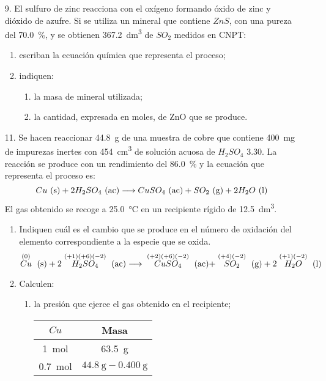 \documentclass[../practica.root.tex]{subfiles}
\begin{document}
\begin{enumerate}
	\item[9.] El sulfuro de zinc reacciona con el oxígeno formando óxido de zinc y dióxido de azufre.
	      Si se utiliza un mineral que contiene $ZnS$, con una pureza del \SI{70,0}{\percent}, y se obtienen
	      \SI{367,2}{\dm\cubed} de $SO_2$ medidos en CNPT:
	      \begin{enumerate}
		      \item escriban la ecuación química que representa el proceso;
		      \item indiquen:
		            \begin{enumerate}
			            \item la masa de mineral utilizada;
			            \item la cantidad, expresada en moles, de ZnO que se produce.
		            \end{enumerate}
	      \end{enumerate}

	\item[11.] Se hacen reaccionar \SI{44,8}{\g} de una muestra de cobre que contiene \SI{400}{\mg} de impurezas
	      inertes con \SI{454}{\cm\cubed} de solución acuosa de $H_2SO_4$ \SI{3,30}{\MR}. La reacción se produce con un
	      rendimiento del \SI{86,0}{\percent} y la ecuación que representa el proceso es:
	      \[ Cu \ \text{(s)} + 2 H_2SO_4 \ \text{(ac)} \longrightarrow{} CuSO_4 \ \text{(ac)} + SO_2 \ \text{(g)} + 2 H_2O \ \text{(l)} \]
	      El gas obtenido se recoge a \SI{25,0}{\celsius} en un recipiente rígido de \SI{12,5}{\dm\cubed}.
	      \begin{enumerate}
		      \item Indiquen cuál es el cambio que se produce en el número de oxidación del elemento
		            correspondiente a la especie que se oxida.
		            \[ \stackrel{(0)}{Cu} \ \text{(s)} + 2 \stackrel{(+1)(+6)(-2)}{H_2SO_4} \ \text{(ac)}
			            \longrightarrow{} \stackrel{(+2)(+6)(-2)}{CuSO_4} \ \text{(ac)} + \stackrel{(+4)(-2)}{SO_2} \ \text{(g)} + 2 \stackrel{(+1)(-2)}{H_2O} \ \text{(l)} \]
		      \item Calculen:
		            \begin{enumerate}[label=\roman*)]
			            \item la presión que ejerce el gas obtenido en el recipiente;

			                  \begin{center}
				                  \begin{tabular}{c|c}
					                  $Cu$            & Masa                           \\
					                  \hline
					                  \SI{1}{\mole}   & \SI{63,5}{\g}                  \\
					                  \SI{0,7}{\mole} & $\SI{44,8}{\g}-\SI{0,400}{\g}$ \\
				                  \end{tabular}
			                  \end{center}


\end{enumerate}
\end{enumerate}
\end{enumerate}
\end{document}

